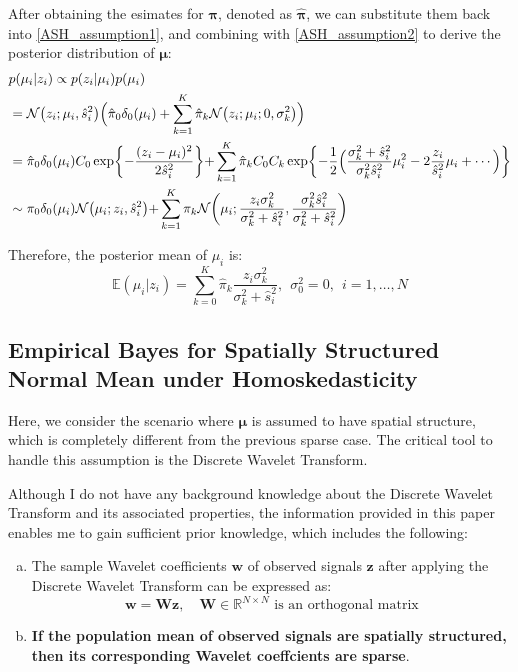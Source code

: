 \documentclass[11pt]{article}
\begin{document}
After obtaining the esimates for ${\boldsymbol{\pi}}$, denoted as $\hat{\boldsymbol{\pi}}$, we can substitute them back into \eqref{ASH_assumption1}, and combining with \eqref{ASH_assumption2} to derive the posterior distribution of $\boldsymbol{\mu}$:
\begin{equation}
\begin{aligned}
& p(\mu_i \vert z_i)  \propto p(z_i \vert \mu_i) p(\mu_i)  \\
& =  \mathcal{N} \bigl(z_i; \mu_i, \hat{s}_i^2 \bigl) \Bigl( \hat{\pi}_0 \delta_0(\mu_i) + \sum_{k=1}^K \hat{\pi}_k \mathcal{N} \bigl(z_i; \mu_i; 0, {\sigma}_k^2 \bigl) \Bigl) \\
& = \hat{\pi}_0 \delta_0(\mu_i) C_0  \exp \biggl\{ - \frac{(z_i - \mu_i)^2}{2 \hat{s}_i^2} \biggl \} + \sum_{k=1}^K \hat{\pi}_k C_0 C_k \exp \biggl\{ -\frac{1}{2} \Bigl( \frac{{\sigma}_k^2 + \hat{s}_i^2}{{\sigma}_k^2 \hat{s}_i^2} \mu_i^2 - 2 \frac{z_i}{\hat{s}_i^2} \mu_i + \cdots \Bigl) \biggl \} \\
& \sim \pi_0 \delta_0(\mu_i) \mathcal{N}\bigl(\mu_i; z_i, \hat{s}_i^2\bigl) + \sum_{k=1}^K \pi_k \mathcal{N}\biggl(\mu_i; \frac{z_i {\sigma}_k^2}{{\sigma}_k^2 + \hat{s}_i^2}, \frac{{\sigma}_k^2 \hat{s}_i^2}{{\sigma}_k^2 + \hat{s}_i^2} \biggl) 
\label{ASH_posterior}
\end{aligned}
\end{equation}

Therefore, the posterior mean of $\mu_i$ is:
$$
\mathbb{E}(\mu_i \vert z_i) = \sum_{k=0}^K \hat{\pi}_k  \frac{z_i {\sigma}_k^2}{{\sigma}_k^2 + \hat{s}_i^2}, \ \ \sigma_0^2 = 0, \ \  i = 1, \ldots, N
$$


\subsection{Empirical Bayes for Spatially Structured Normal Mean under Homoskedasticity}
Here, we consider the scenario where $\boldsymbol{\mu}$ is assumed to have spatial structure, which is completely different from the previous sparse case. The critical tool to handle this assumption is the Discrete Wavelet Transform.

Although I do not have any background knowledge about the Discrete Wavelet Transform and its associated properties, the information provided in this paper enables me to gain sufficient prior knowledge, which includes the following:
\begin{enumerate}[a)]
\item The sample Wavelet coefficients $\boldsymbol{w}$ of observed signals $\boldsymbol{z}$ after applying the Discrete Wavelet Transform can be expressed as:
$$
\boldsymbol{w} = \mathbf{W} \boldsymbol{z}, \quad \mathbf{W} \in \mathbb{R}^{N \times N} \text{ is an orthogonal matrix}
$$
\item \textbf{If the population mean of observed signals are spatially structured, then its corresponding Wavelet coeffcients are sparse}.
\end{enumerate}
\end{document}
